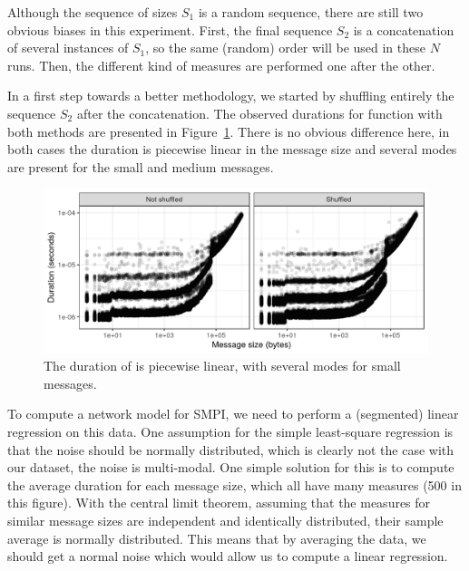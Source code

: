         Although the sequence of sizes \(S_1\) is a random sequence, there are still two obvious biases in this
        experiment.  First, the final sequence \(S_2\) is a concatenation of several instances of \(S_1\), so the same
        (random) order will be used in these \(N\) runs. Then, the different kind of measures are performed one after
        the other.

        In a first step towards a better methodology, we started by shuffling entirely the sequence \(S_2\) after the
        concatenation. The observed durations for function \recv with both methods are presented in
        Figure~\ref{fig:randomizing_order:raw_data}. There is no obvious difference here, in both cases the duration is
        piecewise linear in the message size and several modes are present for the small and medium messages.

        \begin{figure}[htpb]
            \centering
            \includegraphics[width=\linewidth]{img/experiment/randomizing_order/raw_data.png}
            \caption{The duration of \recv is piecewise linear, with several modes for small messages.}%
            \label{fig:randomizing_order:raw_data}
        \end{figure}

        To compute a network model for SMPI, we need to perform a (segmented) linear regression on this data. One
        assumption for the simple least-square regression is that the noise should be normally distributed, which is
        clearly not the case with our dataset, the noise is multi-modal. One simple solution for this is to compute the
        average duration for each message size, which all have many measures (500 in this figure). With the central
        limit theorem, assuming that the measures for similar message sizes are independent and identically distributed,
        their sample average is normally distributed. This means that by averaging the data, we should get a normal
        noise which would allow us to compute a linear regression.

